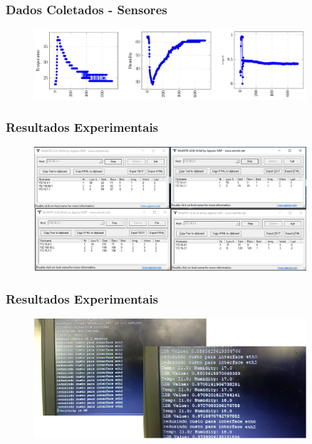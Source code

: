 
\begin{frame}
	\frametitle{Dados Coletados - Sensores} %

	\begin{figure}[h]
		\centering
		\includegraphics[width=0.9\textwidth]{"../Relatorio/Artigo IoT-G4/figs/dados_sensores"}
		\label{dados_sensores}
 	\end{figure}

\end{frame}


\begin{frame}
	\frametitle{Resultados Experimentais}

	\begin{figure}[h]
		\centering
		\includegraphics[width=0.9\textwidth]{"../Relatorio/Artigo IoT-G4/figs/resultado1"}
		\label{resultado1}
 	\end{figure}
\end{frame}


\begin{frame}
	\frametitle{Resultados Experimentais}

	\begin{figure}[h]
		\centering
		\includegraphics[width=0.9\textwidth]{"../Relatorio/Artigo IoT-G4/figs/resultado2"}
		\label{resultado2}
 	\end{figure}
\end{frame}

